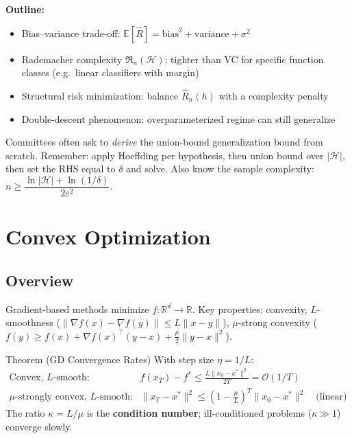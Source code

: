 \documentclass[10pt, letterpaper]{article}
\newcommand{\term}[1]{\textbf{\color{accent}#1}}
\newcommand{\E}{\mathbb{E}}
\newcommand{\R}{\mathbb{R}}
\newcommand{\bigO}[1]{\mathcal{O}\!\left(#1\right)}
\begin{document}
\textbf{Outline:}
\begin{itemize}
  \item Bias–variance trade-off: $\E[\hat{R}] = \text{bias}^2 + \text{variance} + \sigma^2$
  \item Rademacher complexity $\mathfrak{R}_n(\mathcal{H})$: tighter than VC for
        specific function classes (e.g.\ linear classifiers with margin)
  \item Structural risk minimization: balance $\hat{R}_n(h)$ with a complexity penalty
  \item Double-descent phenomenon: overparameterized regime can still generalize
\end{itemize}

\begin{examtip}
Committees often ask to \emph{derive} the union-bound generalization bound from scratch.
Remember: apply Hoeffding per hypothesis, then union bound over $|\mathcal{H}|$, then
set the RHS equal to $\delta$ and solve. Also know the sample complexity:
$n \ge \dfrac{\ln|\mathcal{H}|+\ln(1/\delta)}{2\varepsilon^2}$.
\end{examtip}

\section{Convex Optimization}

\subsection{Overview}
Gradient-based methods minimize $f:\R^d\to\R$. Key properties: convexity,
$L$-smoothness ($\|\nabla f(x)-\nabla f(y)\|\le L\|x-y\|$),
$\mu$-strong convexity ($f(y)\ge f(x)+\nabla f(x)^\top(y-x)+\frac{\mu}{2}\|y-x\|^2$).

\begin{keyresult}{Theorem (GD Convergence Rates)}
With step size $\eta = 1/L$:
\begin{align*}
  \text{Convex, $L$-smooth:}\quad
    &f(x_T)-f^* \le \frac{L\|x_0-x^*\|^2}{2T} = \bigO{1/T}\\[4pt]
  \text{$\mu$-strongly convex, $L$-smooth:}\quad
    &\|x_T-x^*\|^2 \le \left(1-\frac{\mu}{L}\right)^{\!T}\|x_0-x^*\|^2
    \quad\text{(linear)}
\end{align*}
The ratio $\kappa = L/\mu$ is the \term{condition number}; ill-conditioned problems
($\kappa\gg1$) converge slowly.
\end{keyresult}
\end{document}
